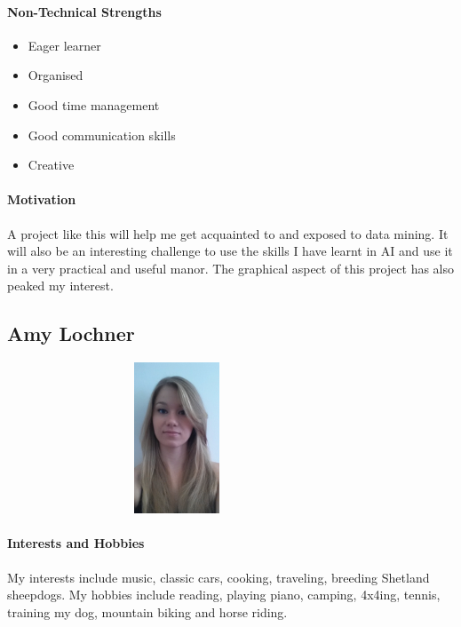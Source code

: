 \documentclass[english]{article}
\begin{document}
			\paragraph{Non-Technical Strengths}
			\begin{itemize}
				\setlength\itemsep{0.2em}
		       	\item Eager learner
		       	\item Organised 
		       	\item Good time management
		       	\item Good communication skills
		       	\item Creative
			\end{itemize}
			
			\paragraph{Motivation}
			A project like this will help me get acquainted to and exposed to data mining. It will also be an interesting challenge to use the skills I have learnt in AI and use it in a very practical and useful manor. The graphical aspect of this project has also peaked my interest.
		
		\newpage
		\subsection{Amy Lochner}
		    \begin{figure}
				\begin{center}
					\includegraphics[width=8cm, height=4.5cm, angle=90]{amy.jpg}
				\end{center}
			\end{figure}
			\paragraph{Interests and Hobbies}
			My interests include music, classic cars, cooking, traveling, breeding Shetland sheepdogs. My hobbies include reading, playing piano, camping, 4x4ing, tennis, training my dog, mountain biking and horse riding.
			
\end{document}
